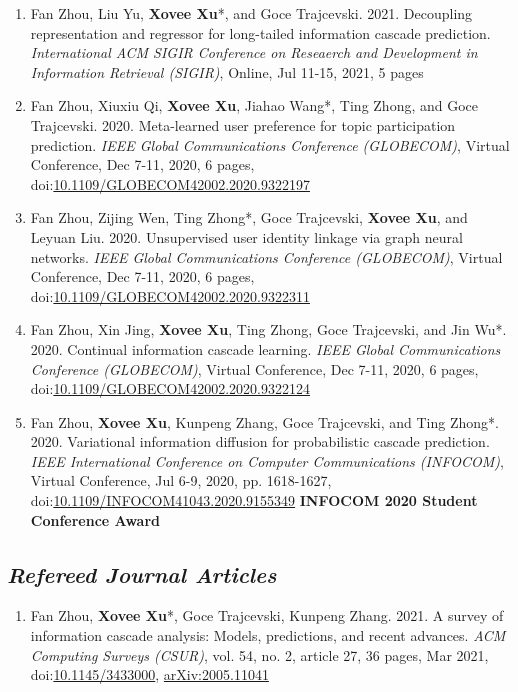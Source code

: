 \documentclass{article}
\begin{document}
\begin{enumerate}
    \item Fan Zhou, Liu Yu, \textbf{Xovee Xu}*, and Goce Trajcevski. 2021. Decoupling representation and regressor for long-tailed information cascade prediction. \textit{International ACM SIGIR Conference on Reseaerch and Development in Information Retrieval (SIGIR)}, Online, Jul 11-15, 2021, 5 pages
    \item Fan Zhou, Xiuxiu Qi, \textbf{Xovee Xu}, Jiahao Wang*, Ting Zhong, and Goce Trajcevski. 2020. Meta-learned user preference for topic participation prediction. \textit{IEEE Global Communications Conference (GLOBECOM)}, Virtual Conference, Dec 7-11, 2020, 6 pages, doi:\href{https://doi.org/10.1109/GLOBECOM42002.2020.9322197}{10.1109/GLOBECOM42002.2020.9322197}
    \item Fan Zhou, Zijing Wen, Ting Zhong*, Goce Trajcevski, \textbf{Xovee Xu}, and Leyuan Liu. 2020. Unsupervised user identity linkage via graph neural networks. \textit{IEEE Global Communications Conference (GLOBECOM)}, Virtual Conference, Dec 7-11, 2020, 6 pages, doi:\href{https://doi.org/10.1109/GLOBECOM42002.2020.9322311}{10.1109/GLOBECOM42002.2020.9322311}
    \item Fan Zhou, Xin Jing, \textbf{Xovee Xu}, Ting Zhong, Goce Trajcevski, and Jin Wu*. 2020. Continual information cascade learning. \textit{IEEE Global Communications Conference (GLOBECOM)}, Virtual Conference, Dec 7-11, 2020, 6 pages, doi:\href{https://doi.org/10.1109/GLOBECOM42002.2020.9322124}{10.1109/GLOBECOM42002.2020.9322124}
    \item Fan Zhou, \textbf{Xovee Xu}, Kunpeng Zhang, Goce Trajcevski, and Ting Zhong*. 2020. Variational information diffusion for probabilistic cascade prediction. \textit{IEEE International Conference on Computer Communications (INFOCOM)}, Virtual Conference, Jul 6-9, 2020, pp. 1618-1627, doi:\href{https://doi.org/10.1109/INFOCOM41043.2020.9155349}{10.1109/INFOCOM41043.2020.9155349}
    \newline \textbf{\color{red}INFOCOM 2020 Student Conference Award}
\end{enumerate}

\subsection*{\textnormal{\textit{Refereed Journal Articles}}}

\begin{enumerate}[resume]
    \item Fan Zhou, \textbf{Xovee Xu}*, Goce Trajcevski, Kunpeng Zhang. 2021. A survey of information cascade analysis: Models, predictions, and recent advances. \textit{ACM Computing Surveys (CSUR)}, vol. 54, no. 2, article 27, 36 pages, Mar 2021, doi:\href{https://xovee.cn/html/paper-redirects/csur2021.html}{10.1145/3433000}, \href{https://arxiv.org/abs/2005.11041}{arXiv:2005.11041}
\end{enumerate}
\end{document}
